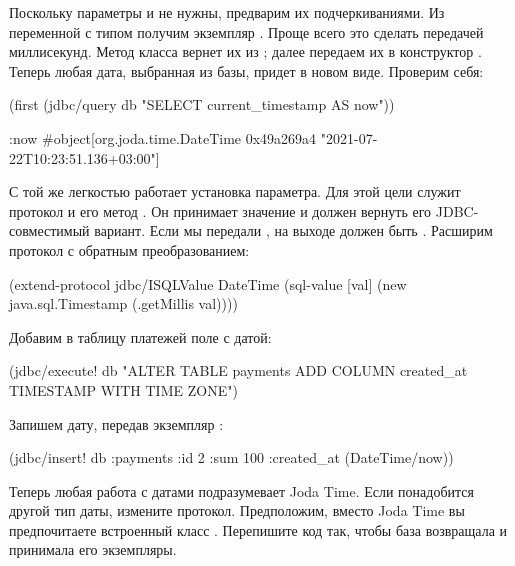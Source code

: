 Поскольку параметры  и  не нужны, предварим их подчеркиваниями. Из переменной  с типом  получим экземпляр . Проще всего это сделать передачей миллисекунд. Метод  класса  вернет их из ; далее передаем их в конструктор . Теперь любая дата, выбранная из базы, придет в новом виде. Проверим себя:

\begin{english}
  \begin{clojure}
(first (jdbc/query db "SELECT current_timestamp AS now"))

{:now #object[org.joda.time.DateTime 0x49a269a4 "2021-07-22T10:23:51.136+03:00"]}
  \end{clojure}
\end{english}

С той же легкостью работает установка параметра. Для этой цели служит протокол  и его метод . Он принимает значение и должен вернуть его JDBC-совместимый вариант. Если мы передали , на выходе должен быть . Расширим протокол с обратным преобразованием:

\begin{english}
  \begin{clojure}
(extend-protocol jdbc/ISQLValue
  DateTime
  (sql-value [val]
    (new java.sql.Timestamp (.getMillis val))))
  \end{clojure}
\end{english}

Добавим в таблицу платежей поле с датой:

\begin{english}
  \begin{clojure}
(jdbc/execute! db "ALTER TABLE payments ADD COLUMN created_at TIMESTAMP WITH TIME ZONE")
  \end{clojure}
\end{english}

Запишем дату, передав экземпляр :

\begin{english}
  \begin{clojure}
(jdbc/insert! db :payments
              {:id 2 :sum 100 :created_at (DateTime/now)})
  \end{clojure}
\end{english}

Теперь любая работа с датами подразумевает Joda Time. Если понадобится другой тип даты, измените протокол. Предположим, вместо Joda Time вы предпочитаете встроенный класс . Перепишите код так, чтобы база возвращала и принимала его экземпляры.

